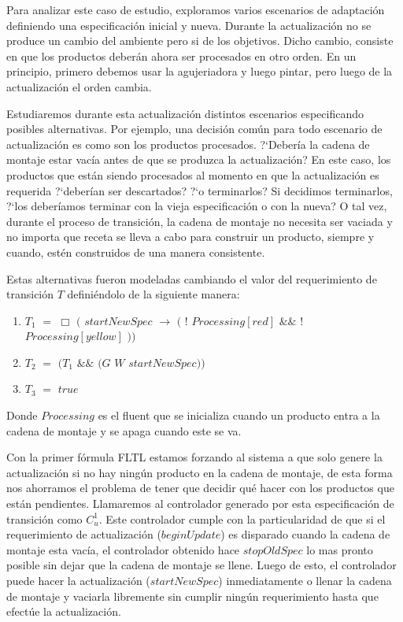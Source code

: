 Para analizar este caso de estudio, exploramos varios escenarios de adaptación definiendo una especificación inicial y
nueva. Durante la actualización no se produce un cambio del ambiente pero si de los objetivos. Dicho cambio, consiste en
que los productos deberán ahora ser procesados en otro orden. En un principio, primero debemos usar la agujeriadora y
luego pintar, pero luego de la actualización el orden cambia. 

Estudiaremos durante esta actualización distintos escenarios especificando posibles alternativas. Por ejemplo, una
decisión común para todo escenario de actualización es como son los productos procesados. ?`Debería la cadena de montaje
estar vacía antes de que se produzca la actualización? En este caso, los productos que están siendo procesados al
momento en que la actualización es requerida ?`deberían ser descartados? ?`o terminarlos? Si decidimos terminarlos,
?`los deberíamos terminar con la vieja especificación o con la nueva? O tal vez, durante el proceso de transición, la
cadena de montaje no necesita ser vaciada y no importa que receta se lleva a cabo para construir un producto, siempre y
cuando, estén construidos de una manera consistente. 

Estas alternativas fueron modeladas cambiando el valor del requerimiento de transición $T$ definiéndolo de la siguiente
manera:

\begin{enumerate}
\item $T_1$ $=$ $\Box$ $($ $startNewSpec$ $\rightarrow$ $($ $!$ $Processing[red]$ $\&\&$ $!$ $Processing[yellow]$ $))$ 
\item $T_2$ $=$ $(T_1$ $\&\&$ $($$G$ $W$ $startNewSpec))$
\item $T_3$ $=$ $true$
\end{enumerate}

Donde $Processing$ es el fluent que se inicializa cuando un producto entra a la cadena de montaje y se apaga cuando este
se va.

Con la primer fórmula FLTL estamos forzando al sistema a que solo genere la actualización si no hay ningún producto en
la cadena de montaje, de esta forma nos ahorramos el problema de tener que decidir qué hacer con los productos que están
pendientes. Llamaremos al controlador generado por esta especificación de transición como $C_u^1$. Este controlador
cumple con la particularidad de que si el requerimiento de actualización ($beginUpdate$) es disparado cuando la cadena
de montaje esta vacía, el controlador obtenido hace $stopOldSpec$ lo mas pronto posible sin dejar que la cadena de
montaje se llene. Luego de esto, el controlador puede hacer la actualización ($startNewSpec$) inmediatamente o llenar la
cadena de montaje y vaciarla libremente sin cumplir ningún requerimiento hasta que efectúe la actualización.

